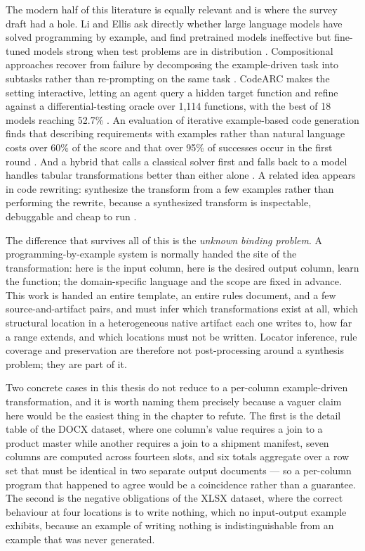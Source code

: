 The modern half of this literature is equally relevant and is where the survey draft had a
hole. Li and Ellis ask directly whether large language models have solved programming by
example, and find pretrained models ineffective but fine-tuned models strong when test problems
are in distribution \cite{li2024pbesolved}. Compositional approaches recover from failure by
decomposing the example-driven task into subtasks rather than re-prompting on the same task
\cite{khan2025compositional}. CodeARC makes the setting interactive, letting an agent query a
hidden target function and refine against a differential-testing oracle over 1{,}114 functions,
with the best of 18 models reaching 52.7\% \cite{wei2025codearc}. An evaluation of iterative
example-based code generation finds that describing requirements with examples rather than
natural language costs over 60\% of the score and that over 95\% of successes occur in the
first round \cite{fu2025firstprompt}. And a hybrid that calls a classical solver first and falls
back to a model handles tabular transformations better than either alone
\cite{zhang2025pbemeetsllm}. A related idea appears in code rewriting: synthesize the transform
from a few examples rather than performing the rewrite, because a synthesized transform is
inspectable, debuggable and cheap to run \cite{cummins2024codethetransforms}.

The difference that survives all of this is the \emph{unknown binding problem}. A
programming-by-example system is normally handed the site of the transformation: here is the
input column, here is the desired output column, learn the function; the domain-specific
language and the scope are fixed in advance. This work is handed an entire template, an entire
rules document, and a few source-and-artifact pairs, and must infer which transformations exist
at all, which structural location in a heterogeneous native artifact each one writes to, how far
a range extends, and which locations must not be written. Locator inference, rule coverage and
preservation are therefore not post-processing around a synthesis problem; they are part of it.

Two concrete cases in this thesis do not reduce to a per-column example-driven transformation,
and it is worth naming them precisely because a vaguer claim here would be the easiest thing in
the chapter to refute. The first is the detail table of the DOCX dataset, where one column's
value requires a join to a product master while another requires a join to a shipment manifest,
seven columns are computed across fourteen slots, and six totals aggregate over a row set that
must be identical in two separate output documents --- so a per-column program that happened to
agree would be a coincidence rather than a guarantee. The second is the negative obligations of
the XLSX dataset, where the correct behaviour at four locations is to write nothing, which no
input-output example exhibits, because an example of writing nothing is indistinguishable from
an example that was never generated.

